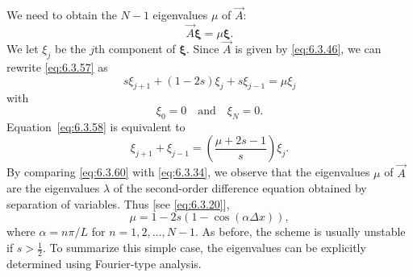 We need to obtain the $N-1$ eigenvalues $\mu$ of $\vec{A}$:
\begin{equation}
\vec{A}\boldsymbol{\xi} = \mu\boldsymbol{\xi}.
\label{eq:6.3.57}
\end{equation}
We let $\xi_j$ be the $j$th component of $\boldsymbol{\xi}$.  Since $\vec{A}$ is given by \eqref{eq:6.3.46}, we can rewrite \eqref{eq:6.3.57} as
\begin{equation}
s\xi_{j+1} + (1-2s)\xi_j + s\xi_{j-1} = \mu\xi_j
\label{eq:6.3.58}
\end{equation}
with
\begin{equation}
\xi_0 = 0 \quad\text{and}\quad \xi_N = 0.
\label{eq:6.3.59}
\end{equation}
Equation~\eqref{eq:6.3.58} is equivalent to
\begin{equation}
\xi_{j+1} + \xi_{j-1} = \left(\frac{\mu + 2s - 1}{s}\right)\xi_j.
\label{eq:6.3.60}
\end{equation}
By comparing \eqref{eq:6.3.60} with \eqref{eq:6.3.34}, we observe that the eigenvalues $\mu$ of $\vec{A}$ are the eigenvalues $\lambda$ of the second-order difference equation obtained by separation of variables.  Thus [see \eqref{eq:6.3.20}],
\begin{equation}
\mu = 1 - 2s(1 - \cos(\alpha\Delta x)),
\label{eq:6.3.61}
\end{equation}
where $\alpha = n\pi/L$ for $n = 1, 2, \ldots, N-1$.  As before, the scheme is usually unstable if $s > \frac{1}{2}$.  To summarize this simple case, the eigenvalues can be explicitly determined using Fourier-type analysis.

